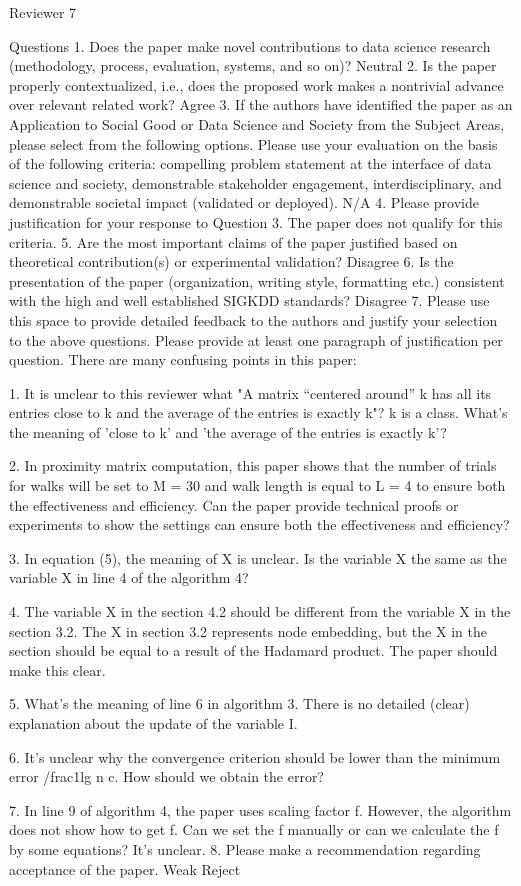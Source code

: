 Reviewer 7

Questions
1. Does the paper make novel contributions to data science research (methodology, process, evaluation, systems, and so on)?
Neutral
2. Is the paper properly contextualized, i.e., does the proposed work makes a nontrivial advance over relevant related work?
Agree
3. If the authors have identified the paper as an Application to Social Good or Data Science and Society from the Subject Areas, please select from the following options. Please use your evaluation on the basis of the following criteria: compelling problem statement at the interface of data science and society, demonstrable stakeholder engagement, interdisciplinary, and demonstrable societal impact (validated or deployed).
N/A
4. Please provide justification for your response to Question 3.
The paper does not qualify for this criteria.
5. Are the most important claims of the paper justified based on theoretical contribution(s) or experimental validation?
Disagree
6. Is the presentation of the paper (organization, writing style, formatting etc.) consistent with the high and well established SIGKDD standards?
Disagree
7. Please use this space to provide detailed feedback to the authors and justify your selection to the above questions. Please provide at least one paragraph of justification per question.
There are many confusing points in this paper:

1. It is unclear to this reviewer what "A matrix “centered around” k has all its entries
close to k and the average of the entries is exactly k"? k is a class. What's the meaning of 'close to k' and 'the average of the entries is exactly k'?

2. In proximity matrix computation, this paper shows that the number of trials for walks will be set to M = 30 and walk length is equal to L = 4 to ensure both the effectiveness and efficiency. Can the paper provide technical proofs or experiments to show the settings can ensure both the effectiveness and efficiency?

3. In equation (5), the meaning of X is unclear. Is the variable X the same as the variable X in line 4 of the algorithm 4?

4. The variable X in the section 4.2 should be different from the variable X in the section 3.2. The X in section 3.2 represents node embedding, but the X in the section should be equal to a result of the Hadamard product. The paper should make this clear.

5. What's the meaning of line 6 in algorithm 3. There is no detailed (clear) explanation about the update of the variable I.

6. It's unclear why the convergence criterion should be lower than the minimum error /frac{1}{lg n c}. How should we obtain the error?

7. In line 9 of algorithm 4, the paper uses scaling factor f. However, the algorithm does not show how to get f. Can we set the f manually or can we calculate the f by some equations? It's unclear.
8. Please make a recommendation regarding acceptance of the paper.
Weak Reject